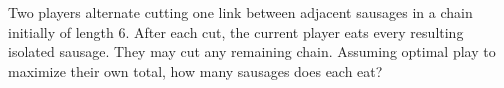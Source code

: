 Two players alternate cutting one link between adjacent sausages in a chain initially of length 6. After each cut, the current player eats every resulting isolated sausage. They may cut any remaining chain. Assuming optimal play to maximize their own total, how many sausages does each eat?
